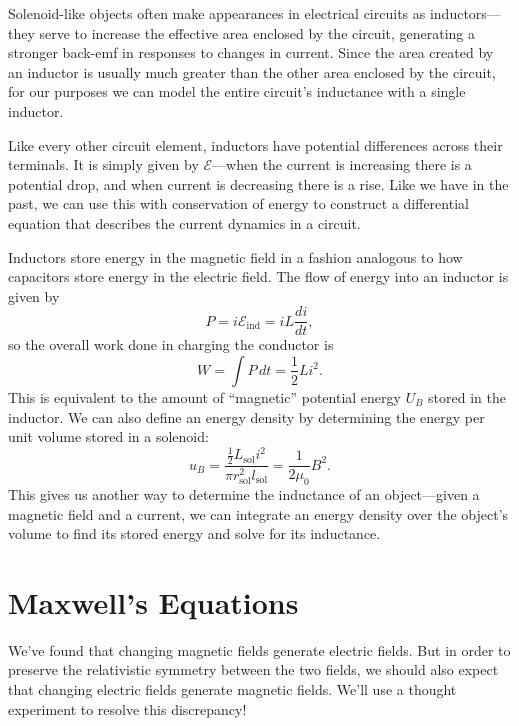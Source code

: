 \documentclass[../p051main.tex]{subfiles}
\begin{document}
Solenoid-like objects often make appearances in electrical circuits as inductors---they serve to increase the effective area enclosed by the circuit, generating a stronger back-emf in responses to changes in current.
Since the area created by an inductor is usually much greater than the other area enclosed by the circuit, for our purposes we can model the entire circuit's inductance with a single inductor.

Like every other circuit element, inductors have potential differences across their terminals.
It is simply given by $\mathcal{E}$---when the current is increasing there is a potential drop, and when current is decreasing there is a rise.
Like we have in the past, we can use this with conservation of energy to construct a differential equation that describes the current dynamics in a circuit.

Inductors store energy in the magnetic field in a fashion analogous to how capacitors store energy in the electric field.
The flow of energy into an inductor is given by
\[ P = i\mathcal{E}_\textrm{ind} = iL \frac{di}{dt}, \]
so the overall work done in charging the conductor is
\[ W = \int P \,dt = \frac{1}{2} Li^2. \]
This is equivalent to the amount of ``magnetic'' potential energy $U_B$ stored in the inductor.
We can also define an energy density by determining the energy per unit volume stored in a solenoid:
\[ u_B = \frac{\frac{1}{2} L_\textrm{sol} i^2}{\pi r_\textrm{sol}^2 l_\textrm{sol}} = \frac{1}{2\mu_0}B^2. \]
This gives us another way to determine the inductance of an object---given a magnetic field and a current, we can integrate an energy density over the object's volume to find its stored energy and solve for its inductance.

\section{Maxwell's Equations}
We've found that changing magnetic fields generate electric fields.
But in order to preserve the relativistic symmetry between the two fields, we should also expect that changing electric fields generate magnetic fields.
We'll use a thought experiment to resolve this discrepancy!
\end{document}
